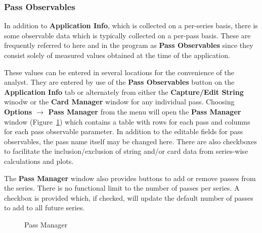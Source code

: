 \documentclass[10pt,letterpaper,titlepage]{article}
\begin{document}
    \subsubsection{Pass Observables}
    In addition to \textbf{Application Info}, which is collected on a per-series basis, there is some observable data which is typically collected on a per-pass basis. These are frequently referred to here and in the program as \textbf{Pass Observables} since they consist solely of measured values obtained at the time of the application.\par
    These values can be entered in several locations for the convenience of the analyst. They are entered by use of the \textbf{Pass Observables} button on the \textbf{Application Info} tab or alternately from either the \textbf{Capture/Edit String} winodw or the \textbf{Card Manager} window for any individual pass. Choosing \textbf{Options $\rightarrow$ Pass Manager} from the menu will open the \textbf{Pass Manager} window (Figure~\ref{fig:pass_manager}) which contains a table with rows for each pass and columns for each pass observable parameter. In addition to the editable fields for pass observables, the pass name itself may be changed here. There are also checkboxes to facilitate the inclusion/exclusion of string and/or card data from series-wise calculations and plots.\par
    The \textbf{Pass Manager} window also provides buttons to add or remove passes from the series. There is no functional limit to the number of passes per series. A checkbox is provided which, if checked, will update the default number of passes to add to all future series.
    \begin{figure}[hb]
        \centering
        \caption{Pass Manager}
        \label{fig:pass_manager}
    \end{figure}
    \newpage
\end{document}
